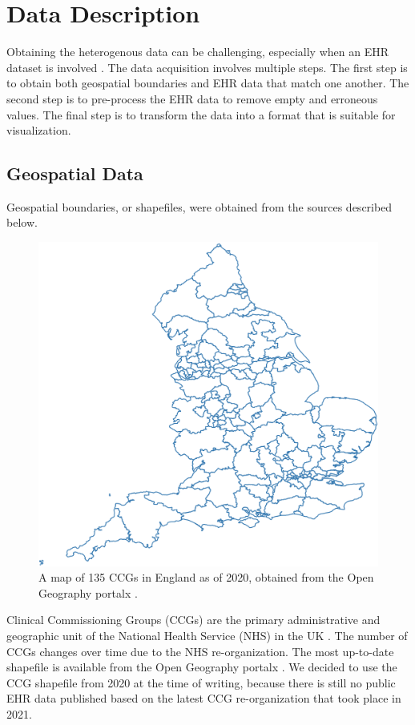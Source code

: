 \section{Data Description}

Obtaining the heterogenous data can be challenging, especially when an EHR dataset is involved \cite{wang2021EHRa}. The data acquisition involves multiple steps. The first step is to obtain both geospatial boundaries and EHR data that match one another. The second step is to pre-process the EHR data to remove empty and erroneous values. The final step is to transform the data into a format that is suitable for visualization.

\subsection{Geospatial Data}

Geospatial boundaries, or shapefiles, were obtained from the sources described below.
{
\begin{figure}[tb!]
    \centering
    \includegraphics[width=0.6\columnwidth]{figure/ccg.png}
    \caption{A map of 135 CCGs in England as of 2020, obtained from the Open Geography portalx \cite{opengeographyportalxOpen}.}
    \label{fig:ccg}
\end{figure}
}


Clinical Commissioning Groups (CCGs) are the primary administrative and geographic unit of the National Health Service (NHS) in the UK \cite{nhsNHS}. The number of CCGs changes over time due to the NHS re-organization. The most up-to-date shapefile is available from the Open Geography portalx \cite{opengeographyportalxOpen}. We decided to use the CCG shapefile from 2020 at the time of writing, because there is still no public EHR data published based on the latest CCG re-organization that took place in 2021.

